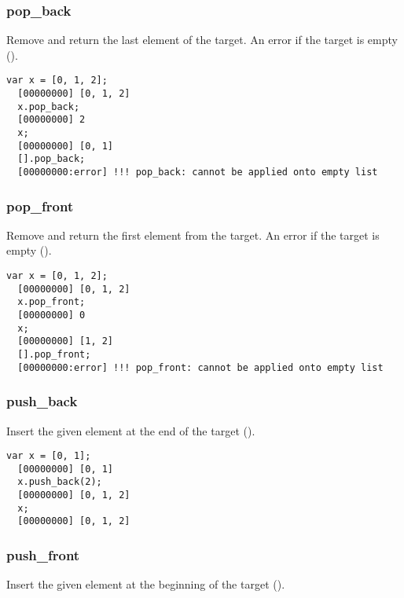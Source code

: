 \subsubsection{pop\_back}

Remove and return the last element of the target. An error if the
target is empty ().

\begin{lstlisting}[caption=List.pop\_back, label=lst:list-popback, float=\floatposh]
  var x = [0, 1, 2];
  [00000000] [0, 1, 2]
  x.pop_back;
  [00000000] 2
  x;
  [00000000] [0, 1]
  [].pop_back;
  [00000000:error] !!! pop_back: cannot be applied onto empty list
\end{lstlisting}

\subsubsection{pop\_front}

Remove and return the first element from the target. An error if the
target is empty ().

\begin{lstlisting}[caption=List.pop\_front, label=lst:list-popfront, float=\floatposh]
  var x = [0, 1, 2];
  [00000000] [0, 1, 2]
  x.pop_front;
  [00000000] 0
  x;
  [00000000] [1, 2]
  [].pop_front;
  [00000000:error] !!! pop_front: cannot be applied onto empty list
\end{lstlisting}

\subsubsection{push\_back}
\label{sect:std-list-pushback}

Insert the given element at the end of the target
().

\begin{lstlisting}[caption=List.push\_back, label=lst:list-pushback, float=\floatposh]
  var x = [0, 1];
  [00000000] [0, 1]
  x.push_back(2);
  [00000000] [0, 1, 2]
  x;
  [00000000] [0, 1, 2]
\end{lstlisting}

\subsubsection{push\_front}

Insert the given element at the beginning of the target
().


